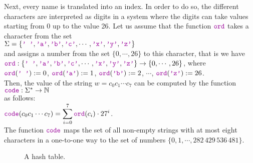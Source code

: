 Next, every name is translated into an index.  In order to do so, the different
characters are interpreted as digits in a system where the digits can take values starting
from 0 up to the value 26.
Let us assume that the function  $\mytt{ord}$ takes a character from the set
\\[0.2cm]
\hspace*{1.3cm}
$\Sigma = \{ \mytt{' '}, \mytt{'a'}, \mytt{'b'}, \mytt{'c'}, \cdots, \mytt{'x'}, \mytt{'y'}, \mytt{'z'} \}$ 
\\[0.2cm]
and assigns a number from the set $\{0,\cdots,26\}$ to this character, that is we have \\[0.2cm]
\hspace*{1.3cm} 
$\mytt{ord}: \{ \mytt{' '}, \mytt{'a'}, \mytt{'b'}, \mytt{'c'}, \cdots, \mytt{'x'}, \mytt{'y'},
\mytt{'z'} \} \rightarrow \{0,\cdots, 26\}$, \quad where
\\[0.2cm]
\hspace*{1.3cm}
$\mytt{ord}(\mytt{' '}) := 0$, \quad
$\mytt{ord}(\mytt{'a'}) := 1$, \quad
$\mytt{ord}(\mytt{'b'}) := 2$, \quad $\cdots$, \quad
$\mytt{ord}(\mytt{'z'}) := 26$.
\\[0.2cm]
Then, the value of the string  $w = c_0c_1\cdots c_7$ can be computed by the function \\[0.2cm]
\hspace*{1.3cm} 
$\mytt{code}: \Sigma^* \rightarrow \mathbb{N}$ \\[0.2cm]
as follows: \\[0.2cm]
\hspace*{1.3cm} 
$\ds \mytt{code}(c_0c_1\cdots c_7) = \sum\limits_{i=0}^7 \mytt{ord}(c_i) \cdot 27^i$.
\\[0.2cm]
The function $\mytt{code}$ maps the set of all non-empty strings with at most eight characters in a
one-to-one way to the set of numbers $\{0,1,\cdots, 282\,429\,536\,481 \}$.


\begin{figure}[!ht]
  \centering
  \caption{A hash table.}
  \label{fig:hash-example}
\end{figure}

